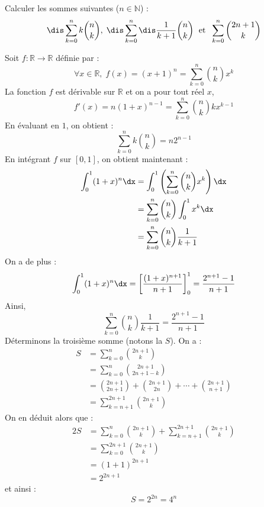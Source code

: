 \documentclass[a4paper,10pt]{report}
\begin{document}
\begin{Exercice}{} Calculer les sommes suivantes ($n \in \mathbb{N}$) : 
$$\dis\sum_{k=0}^n k \binom{n}{k}, \; \dis\sum_{k=0}^n\dis\frac{1}{k+1} \binom{n}{k} \; \hbox{ et } \; \sum_{k=0}^n \binom{2n+1}{k}$$
\end{Exercice}

\corr Soit $f : \mathbb{R} \rightarrow \mathbb{R}$ définie par :
$$ \forall x \in \mathbb{R}, \; f(x)=(x+1)^n = \sum_{k=0}^n \binom{n}{k} x^k$$
La fonction $f$ est dérivable sur $\mathbb{R}$ et on a pour tout réel $x$,
$$ f'(x) = n(1+x)^{n-1}=  \sum_{k=0}^n \binom{n}{k} k x^{k-1} $$
En évaluant en $1$, on obtient :
$$ \sum_{k=0}^n k \binom{n}{k}  = n2^{n-1}$$
En intégrant $f$ sur $[0,1]$, on obtient maintenant :
\begin{align*}
\int_0^1 (1+x)^n \dx & = \int_0^1 \left( \sum_{k=0}^n \binom{n}{k} x^k \right) \dx \\
& = \sum_{k=0}^n \binom{n}{k} \int_0^1 x^k \dx \\
& = \sum_{k=0}^n \binom{n}{k} \dfrac{1}{k+1}
\end{align*}
On a de plus :
$$ \int_0^1 (1+x)^n \dx  = \left[ \dfrac{(1+x)^{n+1}}{n+1} \right]_0^1 = \dfrac{2^{n+1}-1}{n+1}$$
Ainsi,
$$ \sum_{k=0}^n \binom{n}{k} \dfrac{1}{k+1} = \dfrac{2^{n+1}-1}{n+1}$$
Déterminons la troisième somme (notons la $S$). On a :
\begin{align*}
S & = \sum_{k=0}^{n} \binom{2n+1}{k} \\
& = \sum_{k=0}^{n} \binom{2n+1}{2n+1-k} \\
& = \binom{2n+1}{2n+1} + \binom{2n+1}{2n} + \cdots + \binom{2n+1}{n+1} \\
& = \sum_{k=n+1}^{2n+1} \binom{2n+1}{k}
\end{align*}
On en déduit alors que :
\begin{align*}
2S &  = \sum_{k=0}^{n} \binom{2n+1}{k} + \sum_{k=n+1}^{2n+1} \binom{2n+1}{k} \\
& = \sum_{k=0}^{2n+1} \binom{2n+1}{k} \\
& = (1+1)^{2n+1} \\
& = 2^{2n+1} 
\end{align*}
et ainsi :
$$  S= 2^{2n} = 4^n $$
\end{document}
